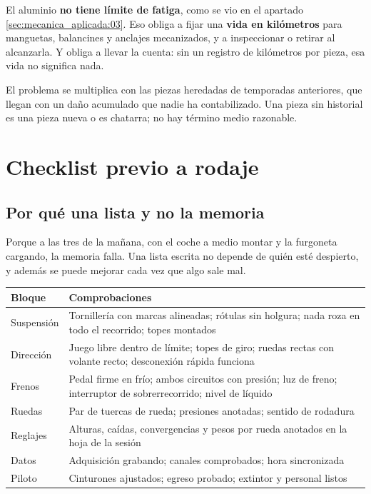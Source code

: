 \begin{ojo}
El aluminio \textbf{no tiene límite de fatiga}, como se vio en el apartado
\ref{sec:mecanica_aplicada:03}. Eso obliga a fijar una \textbf{vida en
kilómetros} para manguetas, balancines y anclajes mecanizados, y a inspeccionar
o retirar al alcanzarla. Y obliga a llevar la cuenta: sin un registro de
kilómetros por pieza, esa vida no significa nada.

El problema se multiplica con las piezas heredadas de temporadas anteriores, que
llegan con un daño acumulado que nadie ha contabilizado. Una pieza sin historial
es una pieza nueva o es chatarra; no hay término medio razonable.
\end{ojo}

\section{Checklist previo a rodaje}
\label{sec:montaje_alineacion:05}

\subsection{Por qué una lista y no la memoria}

Porque a las tres de la mañana, con el coche a medio montar y la furgoneta
cargando, la memoria falla. Una lista escrita no depende de quién esté despierto,
y además se puede mejorar cada vez que algo sale mal.

\begin{center}
\begin{tabularx}{\textwidth}{@{}lX@{}}
\toprule
\textbf{Bloque} & \textbf{Comprobaciones} \\
\midrule
Suspensión & Tornillería con marcas alineadas; rótulas sin holgura; nada roza en
  todo el recorrido; topes montados \\
Dirección & Juego libre dentro de límite; topes de giro; ruedas rectas con
  volante recto; desconexión rápida funciona \\
Frenos & Pedal firme en frío; ambos circuitos con presión; luz de freno;
  interruptor de sobrerrecorrido; nivel de líquido \\
Ruedas & Par de tuercas de rueda; presiones anotadas; sentido de rodadura \\
Reglajes & Alturas, caídas, convergencias y pesos por rueda anotados en la hoja
  de la sesión \\
Datos & Adquisición grabando; canales comprobados; hora sincronizada \\
Piloto & Cinturones ajustados; egreso probado; extintor y personal listos \\
\bottomrule
\end{tabularx}
\end{center}

